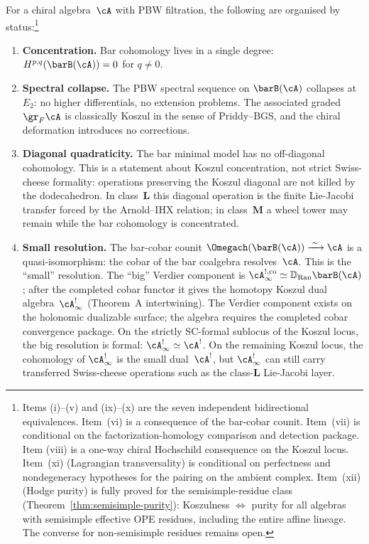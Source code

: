 \begin{theorem}
\label{thm:koszul-dodecahedron}
For a chiral algebra~$\cA$ with PBW filtration, the following are
organised by status\textup{:}\footnote{Items \textup{(i)--(v)}
and \textup{(ix)--(x)} are the seven independent bidirectional
equivalences. Item~\textup{(vi)} is a consequence of the
bar-cobar counit. Item~\textup{(vii)} is conditional on the
factorization-homology comparison and detection package. Item
\textup{(viii)} is a one-way chiral Hochschild consequence on the
Koszul locus. Item~\textup{(xi)}
\textup{(}Lagrangian transversality\textup{)} is conditional on
perfectness and nondegeneracy hypotheses for the pairing on the
ambient complex. Item~\textup{(xii)} \textup{(}Hodge
purity\textup{)} is fully proved for the semisimple-residue class
\textup{(}Theorem~\textup{\ref{thm:semisimple-purity}):}
Koszulness $\Leftrightarrow$ purity for all
algebras with semisimple effective OPE residues, including the
entire affine lineage. The converse for non-semisimple residues
remains open.}
\begin{enumerate}[label=\textup{(\roman*)}]
\item \textbf{Concentration.}
 Bar cohomology lives in a single degree:
 $H^{p,q}(\barB(\cA)) = 0$ for $q \neq 0$.

\item \textbf{Spectral collapse.}
 The PBW spectral sequence on $\barB(\cA)$ collapses at~$E_2$: no
 higher differentials, no extension problems. The associated graded
 $\gr_F\cA$ is classically Koszul in the sense of Priddy--BGS, and
 the chiral deformation introduces no corrections.

\item \textbf{Diagonal quadraticity.}
 The bar minimal model has no off-diagonal cohomology. This is a
 statement about Koszul concentration, not strict Swiss-cheese
 formality: operations preserving the Koszul diagonal are not killed by
 the dodecahedron. In class~$\mathbf L$ this diagonal operation is the
 finite Lie-Jacobi transfer forced by the Arnold--IHX relation; in
 class~$\mathbf M$ a wheel tower may remain while the bar cohomology is
 concentrated.

\item \textbf{Small resolution.}
 The bar-cobar counit
 $\Omegach(\barB(\cA)) \xrightarrow{\;\sim\;} \cA$ is a
 quasi-isomorphism: the cobar of the bar coalgebra resolves~$\cA$.
 This is the ``small'' resolution. The ``big'' Verdier component is
 $\cA^{!,\mathrm{co}}_\infty\simeq
 \mathbb{D}_{\operatorname{Ran}}\barB(\cA)$; after the completed cobar
 functor it gives the homotopy Koszul dual algebra~$\cA^!_\infty$
 (Theorem~A intertwining). The Verdier component exists on the
 holonomic dualizable surface; the algebra requires the completed
 cobar convergence package. On the strictly SC-formal sublocus of the
 Koszul locus, the big resolution is formal:
 $\cA^!_\infty \simeq \cA^!$. On the remaining Koszul locus,
 the cohomology of $\cA^!_\infty$ is the small dual~$\cA^!$, but
 $\cA^!_\infty$ can still carry transferred Swiss-cheese operations
 such as the class-$\mathbf L$ Lie-Jacobi layer.


\end{enumerate}
\end{theorem}
